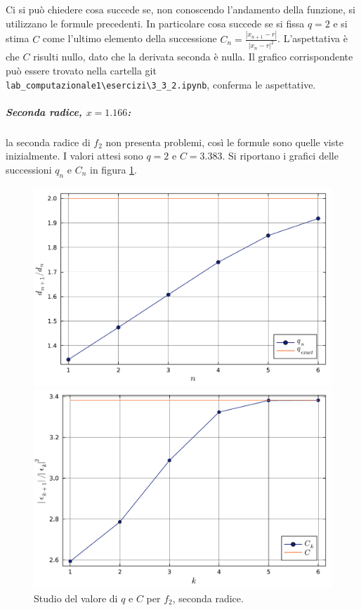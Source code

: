 \documentclass[letterpaper, 12pt]{article}
\numberwithin{equation}{section}    %
\begin{document}
Ci si può chiedere cosa succede se, non conoscendo l'andamento della funzione, si utilizzano le formule
precedenti. In particolare cosa succede se si fissa $q = 2$ e si stima $C$ come l'ultimo elemento della successione
$C_n = \frac{|x_{n+1}-r|}{|x_n-r|^2}$. L'aspettativa è che $C$ risulti nullo, dato che la derivata seconda
è nulla. Il grafico corrispondente può essere trovato nella cartella git
\verb|lab_computazionale1\esercizi\3_3_2.ipynb|, conferma le aspettative. 

\subparagraph{Seconda radice, $x = 1.166$:} la seconda radice di $f_2$ non presenta problemi, così le formule
sono quelle viste inizialmente. I valori attesi sono $q = 2$ e $C = 3.383$. 
Si riportano i grafici delle successioni $q_n$ e $C_n$ in figura \ref{fig:es3_3_2_4}.
\begin{figure}[!ht]
    \centering
    \begin{minipage}[b]{0.47\textwidth}
        \includegraphics[width=\textwidth]{3322_q2.pdf}
    \end{minipage}
    \hspace{0.5cm}
    \begin{minipage}[b]{0.47\textwidth}
        \includegraphics[width=\textwidth]{3322_C2.pdf}
    \end{minipage}
    \caption{Studio del valore di $q$ e $C$ per $f_2$, seconda radice.}
    \label{fig:es3_3_2_4}
\end{figure}
\end{document}
